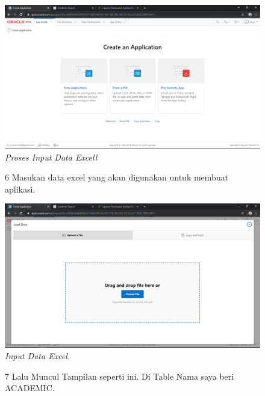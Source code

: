 \begin{enumerate}
\begin{figure}
    \begin{center}
\includegraphics[scale=0.2]{figures/5.png}
    \caption{\textit{{Proses Input Data Excel}l}}
        \end{center}
\label{gambar}
\end{figure}

\begin{figure}
\item[6] Masukan data excel yang akan digunakan untuk membuat aplikasi.

    \begin{center}
\includegraphics[scale=0.2]{figures/6.png}
    \caption{\textit{Input Data Excel.}}
        \end{center}
\label{gambar}
\end{figure}

\begin{figure}
\item[7] Lalu Muncul Tampilan seperti ini. Di Table Nama saya beri ACADEMIC.


\end{figure}
\end{enumerate}
